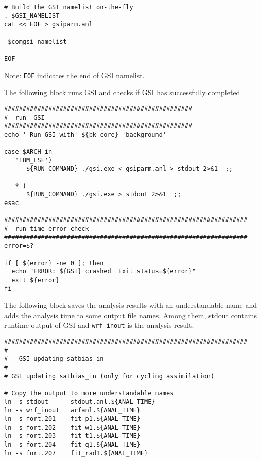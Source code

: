 \begin{footnotesize}
\begin{verbatim}
# Build the GSI namelist on-the-fly
. $GSI_NAMELIST
cat << EOF > gsiparm.anl

 $comgsi_namelist

EOF
\end{verbatim}
\end{footnotesize}

Note: \verb|EOF| indicates the end of GSI namelist.


The following block runs GSI and checks if GSI has successfully completed. 

\begin{footnotesize}
\begin{verbatim}
###################################################
#  run  GSI
###################################################
echo ' Run GSI with' ${bk_core} 'background'

case $ARCH in
   'IBM_LSF')
      ${RUN_COMMAND} ./gsi.exe < gsiparm.anl > stdout 2>&1  ;;

   * )
      ${RUN_COMMAND} ./gsi.exe > stdout 2>&1  ;;
esac

##################################################################
#  run time error check
##################################################################
error=$?

if [ ${error} -ne 0 ]; then
  echo "ERROR: ${GSI} crashed  Exit status=${error}"
  exit ${error}
fi
\end{verbatim}
\end{footnotesize}

The following block saves the analysis results with an understandable name and adds the analysis time to some output file names. Among them, stdout contains runtime output of GSI and \verb|wrf_inout| is the analysis result.

\begin{footnotesize}
\begin{verbatim}
##################################################################
#
#   GSI updating satbias_in
#
# GSI updating satbias_in (only for cycling assimilation)

# Copy the output to more understandable names
ln -s stdout      stdout.anl.${ANAL_TIME}
ln -s wrf_inout   wrfanl.${ANAL_TIME}
ln -s fort.201    fit_p1.${ANAL_TIME}
ln -s fort.202    fit_w1.${ANAL_TIME}
ln -s fort.203    fit_t1.${ANAL_TIME}
ln -s fort.204    fit_q1.${ANAL_TIME}
ln -s fort.207    fit_rad1.${ANAL_TIME}
\end{verbatim}
\end{footnotesize}

